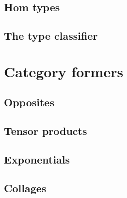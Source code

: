 \documentclass{amsart}
\begin{document}
\subsection{Hom types}
\label{sec:hom-types}

\subsection{The type classifier}
\label{sec:type-classifier}


\section{Category formers}
\label{sec:category-formers}

\subsection{Opposites}
\label{sec:opposites}

\subsection{Tensor products}
\label{sec:tensor-products}

\subsection{Exponentials}
\label{sec:exponentials}

\subsection{Collages}
\label{sec:collages}
\end{document}
